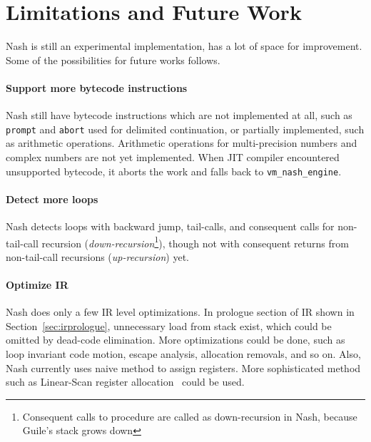 \documentclass[preprint, 10pt]{sigplanconf}
\begin{document}


\section{Limitations and Future Work}
\label{sec:future}

Nash is still an experimental implementation, has a lot of space for
improvement. Some of the possibilities for future works follows.

\paragraph{Support more bytecode instructions} Nash still have bytecode
instructions which are not implemented at all, such as \texttt{prompt} and
\texttt{abort} used for delimited continuation, or partially implemented, such
as arithmetic operations. Arithmetic operations for multi-precision numbers
and complex numbers are not yet implemented. When JIT compiler encountered
unsupported bytecode, it aborts the work and falls back to
\texttt{vm\_nash\_engine}.

\paragraph{Detect more loops} Nash detects loops with backward jump,
tail-calls, and consequent calls for non-tail-call recursion
(\textit{down-recursion}\footnote{Consequent calls to procedure are called as
  down-recursion in Nash, because Guile's stack grows down}), though not with
consequent returns from non-tail-call recursions (\textit{up-recursion}) yet.


\paragraph{Optimize IR} Nash does only a few IR level
optimizations. In prologue section of IR shown in
Section~\hyperref[sec:irprologue]{\ref{sec:irprologue}}, unnecessary load from
stack exist, which could be omitted by dead-code elimination. More optimizations
could be done, such as loop invariant code motion, escape analysis, allocation
removals, and so on. Also, Nash currently uses naive method to assign
registers. More sophisticated method such as Linear-Scan register
allocation~\cite{poletto1999linear} could be used.
\end{document}
